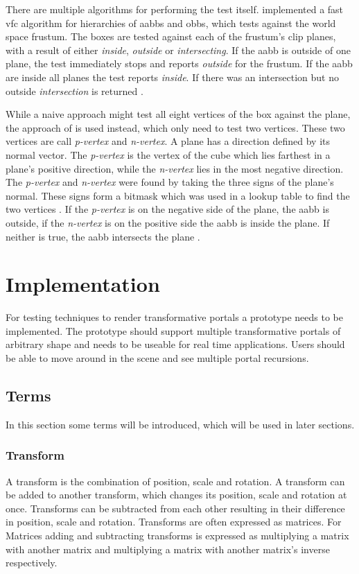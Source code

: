 There are multiple algorithms for performing the test itself. \textcite{assarsson:2000:optimized} implemented a fast \gls{vfc} algorithm for hierarchies of \glspl{aabb} and \glspl{obb}, which tests against the world space frustum. The boxes are tested against each of the frustum's clip planes, with a result of either \textit{inside}, \textit{outside} or \textit{intersecting}. If the \gls{aabb} is outside of one plane, the test immediately stops and reports \textit{outside} for the frustum. If the \gls{aabb} are inside all planes the test reports \textit{inside}. If there was an intersection but no outside \textit{intersection} is returned \cite{assarsson:2000:optimized}.

While a naive approach might test all eight vertices of the box against the plane, the approach of \textcite{greene:1994:detecting} is used instead, which only need to test two vertices. These two vertices are call \textit{p-vertex} and \textit{n-vertex}. A plane has a direction defined by its normal vector. The \textit{p-vertex} is the vertex of the cube which lies farthest in a plane's positive direction, while the \textit{n-vertex} lies in the most negative direction. The \textit{p-vertex} and \textit{n-vertex} were found by taking the three signs of the plane's normal. These signs form a bitmask which was used in a lookup table to find the two vertices \cite{assarsson:2000:optimized}. If the \textit{p-vertex} is on the negative side of the plane, the \gls{aabb} is outside, if the \textit{n-vertex} is on the positive side the \gls{aabb} is inside the plane. If neither is true, the \gls{aabb} intersects the plane \cite{greene:1994:detecting}.

\chapter{Implementation}
\label{section:implementation}
For testing techniques to render transformative portals a prototype needs to be implemented. The prototype should support multiple transformative portals of arbitrary shape and needs to be useable for real time applications. Users should be able to move around in the scene and see multiple portal recursions.

\section{Terms}
In this section some terms will be introduced, which will be used in later sections.

\subsection{Transform}
A transform is the combination of position, scale and rotation. A transform can be added to another transform, which changes its position, scale and rotation at once. Transforms can be subtracted from each other resulting in their difference in position, scale and rotation. Transforms are often expressed as matrices. For Matrices adding and subtracting transforms is expressed as multiplying a matrix with another matrix and multiplying a matrix with another matrix's inverse respectively.

